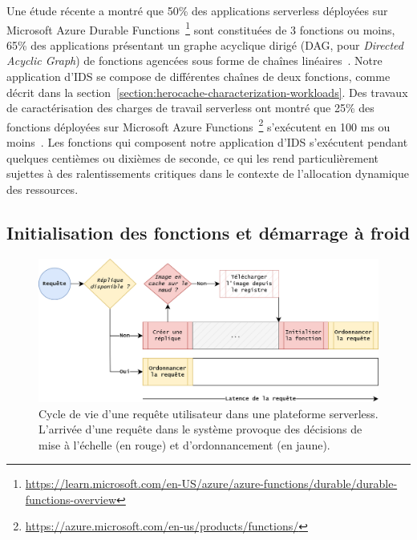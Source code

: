 Une étude récente a montré que 50\% des applications serverless déployées sur Microsoft Azure Durable Functions~\footnote{\href{https://learn.microsoft.com/en-US/azure/azure-functions/durable/durable-functions-overview}{https://learn.microsoft.com/en-US/azure/azure-functions/durable/durable-functions-overview}} sont constituées de 3 fonctions ou moins, 65\% des applications présentant un graphe acyclique dirigé (\gls{DAG}, pour \textit{Directed Acyclic Graph}) de fonctions agencées sous forme de chaînes linéaires~\cite{mahgoubORIONThreeRights}. Notre application d'IDS se compose de différentes chaînes de deux fonctions, comme décrit dans la section~\ref{section:herocache-characterization-workloads}. Des travaux de caractérisation des charges de travail serverless ont montré que 25\% des fonctions déployées sur Microsoft Azure Functions~\footnote{\href{https://azure.microsoft.com/en-us/products/functions/}{https://azure.microsoft.com/en-us/products/functions/}} s'exécutent en 100 ms ou moins~\cite{shahradServerlessWildCharacterizing}. Les fonctions qui composent notre application d'IDS s'exécutent pendant quelques centièmes ou dixièmes de seconde, ce qui les rend particulièrement sujettes à des ralentissements critiques dans le contexte de l'allocation dynamique des ressources.

\subsection{Initialisation des fonctions et démarrage à froid}
\label{section:herocache-background-cache}

\begin{figure}[!ht]
    \centering
    \includegraphics[width=0.8\columnwidth]{5_Chapitre5/figures/function-cache.png}
    \caption{Cycle de vie d'une requête utilisateur dans une plateforme serverless. L'arrivée d'une requête dans le système provoque des décisions de mise à l'échelle (en rouge) et d'ordonnancement (en jaune).}
    \label{figure:herocache-function-cache}
\end{figure}

